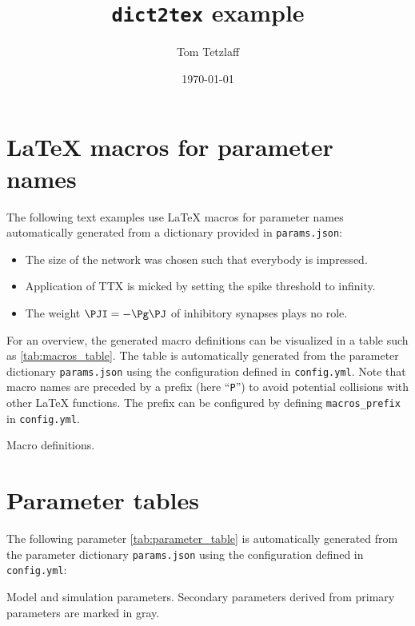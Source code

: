 \documentclass[10pt,a4paper,american]{article}
\begin{document}
\title{\texttt{dict2tex} example}
\author{Tom Tetzlaff}
\date{\today}

\maketitle
\tableofcontents

\section{LaTeX macros for parameter names}


The following text examples use LaTeX macros for parameter names automatically generated from a dictionary provided in \texttt{params.json}:
\begin{itemize}
\item The size \PN of the network was chosen such that everybody is impressed.
\item Application of TTX is micked by setting the spike threshold \PVth to infinity.
\item The weight $\PJI=-\Pg\PJ$ of inhibitory synapses plays no role.
\end{itemize}
For an overview, the generated macro definitions can be visualized in a table such as \cref{tab:macros_table}. The table is automatically generated from the parameter dictionary \texttt{params.json} using the configuration defined in \texttt{config.yml}. Note that macro names are preceded by a prefix (here ``\verb+P+'') to avoid potential collisions with other LaTeX functions. The prefix can be configured by defining \verb+macros_prefix+ in \texttt{config.yml}.
\begin{table}[ht!]
\begin{center}
  \parbox{0.8\linewidth}{       %
    \small%
    \centering%
    \renewcommand{\arraystretch}{1.5}%
    \noindent%
    \caption{Macro definitions.}
    \label{tab:macros_table}
  }
\end{center}
\end{table}

\section{Parameter tables}
The following parameter \cref{tab:parameter_table} is automatically generated from the parameter dictionary \texttt{params.json} using the configuration defined in \texttt{config.yml}: 
\begin{table}[ht!]
\begin{center}
  \parbox{0.8\linewidth}{       %
    \small%
    \centering%
    \renewcommand{\arraystretch}{1.5}%
    \noindent%
    \caption{Model and simulation parameters. Secondary parameters derived from primary parameters are marked in gray.}
    \label{tab:parameter_table}
  }
\end{center}
\end{table}
\end{document}
